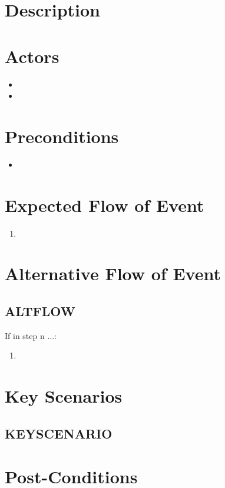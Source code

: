 \documentclass{scrreprt}
\begin{document}
\section{Description}

\section{Actors}
\begin{itemize}
    \item 
    \item 
\end{itemize}

\section{Preconditions}
\begin{itemize}
    \item 
\end{itemize}

\section{Expected Flow of Event}
\begin{enumerate}[1.]
    \item 
\end{enumerate}

\section{Alternative Flow of Event}

    \subsection{ALTFLOW}
    If in step n ...:
    \begin{enumerate}
        \item 
    \end{enumerate}

\section{Key Scenarios}
    \subsection{KEYSCENARIO}

\section{Post-Conditions}
\end{document}
